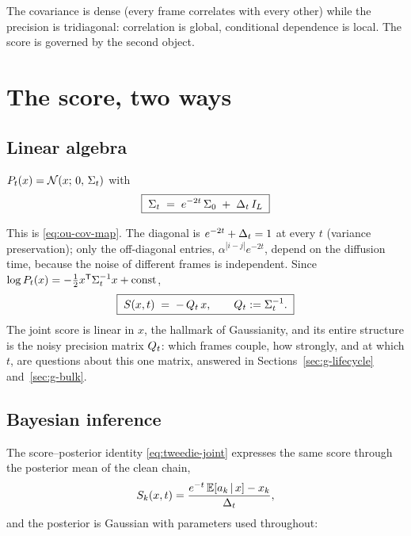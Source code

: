 The covariance is dense (every frame correlates with every other) while
the precision is tridiagonal: correlation is global, conditional
dependence is local. The score is governed by the second object.

\section{The score, two ways}\label{sec:g-score}

\subsection{Linear algebra}

\begin{proposition}\label{prop:g-Sigt}
$P_t(x) = \mathcal{N}(x;\, 0,\, \Sigma_t)$ with
\begin{equation}
  \boxed{\;\Sigma_t \;=\; e^{-2t}\, \Sigma_0 \;+\; \Delta_t\, I_L\;}
  \label{eq:g-Sigt}
\end{equation}
\end{proposition}
This is \eqref{eq:ou-cov-map}. The diagonal is
$e^{-2t} + \Delta_t = 1$ at every $t$ (variance preservation); only the
off-diagonal entries, $\alpha^{|i-j|} e^{-2t}$, depend on the diffusion
time, because the noise of different frames is independent. Since
$\log P_t(x) = -\tfrac{1}{2} x^{\mathsf{T}} \Sigma_t^{-1} x + \text{const}$,
\begin{equation}
  \boxed{\;S(x, t) \;=\; -\,Q_t\, x,
  \qquad Q_t := \Sigma_t^{-1}.\;}
  \label{eq:g-score-matrix}
\end{equation}
The joint score is linear in $x$, the hallmark of Gaussianity, and its
entire structure is the noisy precision matrix $Q_t$: which frames couple,
how strongly, and at which $t$, are questions about this one matrix,
answered in Sections~\ref{sec:g-lifecycle} and~\ref{sec:g-bulk}.

\subsection{Bayesian inference}

The score--posterior identity \eqref{eq:tweedie-joint} expresses the same
score through the posterior mean of the clean chain,
\begin{equation}
  S_k(x, t)
  = \frac{e^{-t}\, \mathbb{E}[a_k \,|\, x] - x_k}{\Delta_t} ,
  \label{eq:g-tweedie}
\end{equation}
and the posterior is Gaussian with parameters used throughout:

